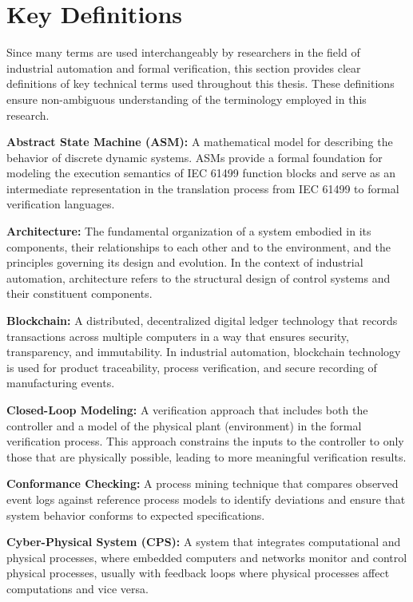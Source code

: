 \section{Key Definitions}

Since many terms are used interchangeably by researchers in the field of industrial automation and formal verification, this section provides clear definitions of key technical terms used throughout this thesis. These definitions ensure non-ambiguous understanding of the terminology employed in this research.

\textbf{Abstract State Machine (ASM):} A mathematical model for describing the behavior of discrete dynamic systems. ASMs provide a formal foundation for modeling the execution semantics of IEC 61499 function blocks and serve as an intermediate representation in the translation process from IEC 61499 to formal verification languages.

\textbf{Architecture:} The fundamental organization of a system embodied in its components, their relationships to each other and to the environment, and the principles governing its design and evolution. In the context of industrial automation, architecture refers to the structural design of control systems and their constituent components.

\textbf{Blockchain:} A distributed, decentralized digital ledger technology that records transactions across multiple computers in a way that ensures security, transparency, and immutability. In industrial automation, blockchain technology is used for product traceability, process verification, and secure recording of manufacturing events.

\textbf{Closed-Loop Modeling:} A verification approach that includes both the controller and a model of the physical plant (environment) in the formal verification process. This approach constrains the inputs to the controller to only those that are physically possible, leading to more meaningful verification results.

\textbf{Conformance Checking:} A process mining technique that compares observed event logs against reference process models to identify deviations and ensure that system behavior conforms to expected specifications.

\textbf{Cyber-Physical System (CPS):} A system that integrates computational and physical processes, where embedded computers and networks monitor and control physical processes, usually with feedback loops where physical processes affect computations and vice versa.

